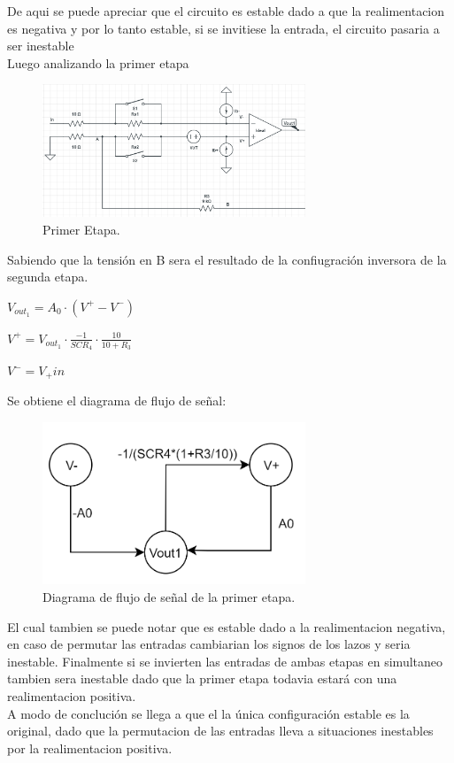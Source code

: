 \documentclass[a4paper]{article}
\begin{document}
De aqui se puede apreciar que el circuito es estable dado a que la realimentacion es negativa y por lo tanto estable, si se invitiese la entrada, el circuito pasaria a ser inestable\\
Luego analizando la primer etapa
\begin{figure}[H]	
	\centering
	\includegraphics[width=0.7\textwidth]{imagenes/PrimeraEtapa.PNG}
	\caption{Primer Etapa.}
	\label{fig:PrimerEtapa}
\end{figure}
Sabiendo que la tensión en B sera el resultado de la confiugración inversora de la segunda etapa.\\
\begin{center}$V_{out_1}=A_0 \cdot (V^+ - V^-)$\\\end{center}
\begin{center}$V^+= V_{out_1}\cdot \frac{-1}{SCR_4} \cdot \frac{10}{10+R_3} $\\\end{center}
\begin{center}$V^- = V_+{in}$\\\end{center}
Se obtiene el diagrama de flujo de señal:
\begin{figure}[H]	
	\centering
	\includegraphics[width=0.7\textwidth]{imagenes/PrimerEtapaDiagrama.PNG}
	\caption{Diagrama de flujo de señal de la primer etapa.}
	\label{fig:PrimerEtapaDiagrama}
\end{figure}
El cual tambien se puede notar que es estable dado a la realimentacion negativa, en caso de permutar las entradas cambiarian los signos de los lazos y seria inestable.
Finalmente si se invierten las entradas de ambas etapas en simultaneo tambien sera inestable dado que la primer etapa todavia estará con una realimentacion positiva.\\
A modo de conclución se llega a que el la única configuración estable es la original, dado que la permutacion de las entradas lleva a situaciones inestables por la realimentacion positiva.
\end{document}
